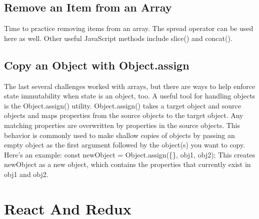 \documentclass{article}%
\begin{document}
%
\subsection{Remove an Item from an Array}%
\label{subsec:RemoveanItemfromanArray}%
Time to practice removing items from an array. The spread operator can be used here as well. Other useful JavaScript methods include slice() and concat().\newline%

%
\subsection{Copy an Object with Object.assign}%
\label{subsec:CopyanObjectwithObject.assign}%
The last several challenges worked with arrays, but there are ways to help enforce state immutability when state is an object, too. A useful tool for handling objects is the Object.assign() utility. Object.assign() takes a target object and source objects and maps properties from the source objects to the target object. Any matching properties are overwritten by properties in the source objects. This behavior is commonly used to make shallow copies of objects by passing an empty object as the first argument followed by the object(s) you want to copy. Here's an example:\newline%
const newObject = Object.assign(\{\}, obj1, obj2);\newline%
This creates newObject as a new object, which contains the properties that currently exist in obj1 and obj2.\newline%

%
\newpage%
\section{React And Redux}%
\label{sec:ReactAndRedux}%
\end{document}
